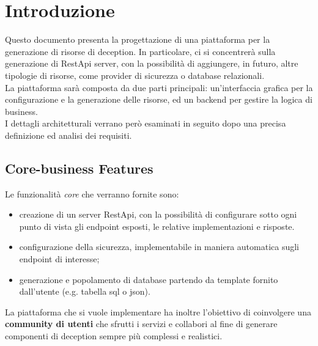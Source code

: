 \chapter{Introduzione}

Questo documento presenta la progettazione di una piattaforma per la generazione di risorse di deception. In particolare, ci si concentrerà sulla generazione di RestApi server, con la possibilità di aggiungere, in futuro, altre tipologie di risorse, come provider di sicurezza o database relazionali.\\

\noindent La piattaforma sarà composta da due parti principali: un'interfaccia grafica per la configurazione e la generazione delle risorse, ed un backend per gestire la logica di business.\\
I dettagli architetturali verrano però esaminati in seguito dopo una precisa definizione ed analisi dei requisiti.\\

\section{Core-business Features}

Le funzionalità \textit{core} che verranno fornite sono:
\begin{itemize}
    \item creazione di un server RestApi, con la possibilità di configurare sotto ogni punto di vista gli endpoint esposti, le relative implementazioni e risposte.
    \item configurazione della sicurezza, implementabile in maniera automatica sugli endpoint di interesse;
    \item generazione e popolamento di database partendo da template fornito dall'utente (e.g. tabella sql o json).
\end{itemize}


\noindent La piattaforma che si vuole implementare ha inoltre l'obiettivo di coinvolgere una \textbf{community di utenti} che sfrutti i servizi e collabori al fine di generare componenti di deception sempre più complessi e realistici.\\


